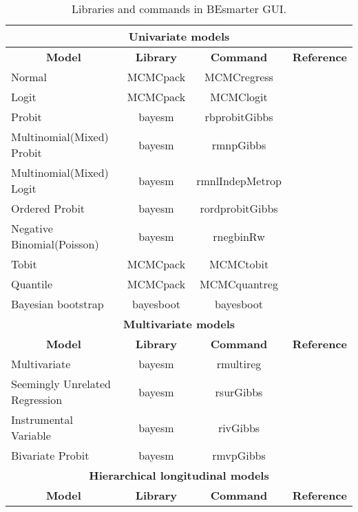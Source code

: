 \begin{table}[!ht]
	\begin{center}
	\caption{Libraries and commands in BEsmarter GUI.} \label{tab:libraries}
	{{
	\begin{tabular}{|l|c|c|c|}
	\hline 
	\multicolumn{4}{|c|}{\textbf{Univariate models}} \\
	\hline  
	 \multicolumn{1}{|c|}{\textbf{Model}} & \multicolumn{1}{c}{\textbf{Library}} & \multicolumn{1}{|c|}{\textbf{Command}} &
	 \multicolumn{1}{|c|}{\textbf{Reference}} \\ 
	 \hline 
	Normal & MCMCpack & MCMCregress & \cite{Martin2018}\\
	Logit & MCMCpack & MCMClogit & \cite{Martin2018} \\
	Probit & bayesm & rbprobitGibbs & \cite{Rossi2017} \\
	Multinomial(Mixed) Probit  & bayesm & rmnpGibbs & \cite{Rossi2017} \\
	Multinomial(Mixed) Logit  & bayesm  & rmnlIndepMetrop & \cite{Rossi2017} \\
	Ordered Probit  & bayesm  & rordprobitGibbs & \cite{Rossi2017} \\
	Negative Binomial(Poisson)   & bayesm & rnegbinRw & \cite{Rossi2017} \\
	Tobit   & MCMCpack & MCMCtobit & \cite{Martin2018} \\
	Quantile   & MCMCpack & MCMCquantreg & \cite{Martin2018} \\
	Bayesian bootstrap & bayesboot & bayesboot & \cite{Baath2018} \\
	\hline 
	\multicolumn{4}{|c|}{\textbf{Multivariate models}} \\
	\hline  
	\multicolumn{1}{|c|}{\textbf{Model}} & \multicolumn{1}{c}{\textbf{Library}} & \multicolumn{1}{|c|}{\textbf{Command}} &\multicolumn{1}{|c|}{\textbf{Reference}} \\ 
	\hline
	Multivariate   & bayesm & rmultireg & \cite{Rossi2017} \\
	Seemingly Unrelated Regression & bayesm & rsurGibbs & \cite{Rossi2017} \\
	Instrumental Variable  & bayesm & rivGibbs & \cite{Rossi2017} \\
	Bivariate Probit   & bayesm & rmvpGibbs & \cite{Rossi2017} \\
	\hline
	\multicolumn{4}{|c|}{\textbf{Hierarchical longitudinal models}} \\
	\hline  
	\multicolumn{1}{|c|}{\textbf{Model}} & \multicolumn{1}{c}{\textbf{Library}} & \multicolumn{1}{|c|}{\textbf{Command}} & \multicolumn{1}{|c|}{\textbf{Reference}} \\ 

\end{tabular}}}
\end{center}
\end{table}
